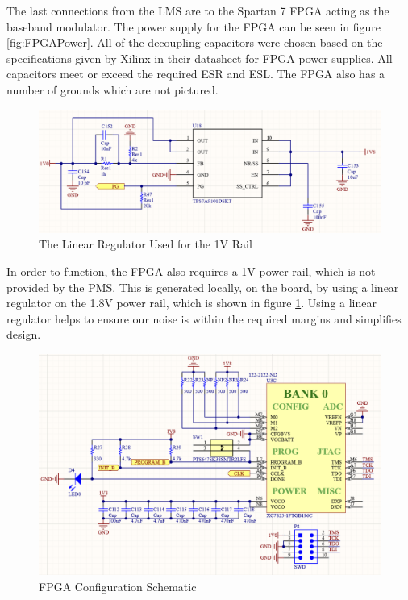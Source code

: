 \documentclass[crop=false]{standalone}
\begin{document}
        The last connections from the LMS are to the Spartan 7 FPGA acting as the baseband modulator. The power supply for the FPGA can be seen in figure \ref{fig:FPGAPower}. All of the decoupling capacitors were chosen based on the specifications given by Xilinx in their datasheet for FPGA power supplies. All capacitors meet or exceed the required ESR and ESL. The FPGA also has a number of grounds which are not pictured.
            
        \begin{figure}[H]
            \centering
            \includegraphics[width=\textwidth]{FPGA1V.PNG}
            \caption{The Linear Regulator Used for the 1V Rail}
            \label{fig:FPGA1V}
        \end{figure}
            
        In order to function, the FPGA also requires a 1V power rail, which is not provided by the PMS. This is generated locally, on the board, by using a linear regulator on the 1.8V power rail, which is shown in figure \ref{fig:FPGA1V}. Using a linear regulator helps to ensure our noise is within the required margins and simplifies design.
            
        \begin{figure}[H]
            \centering
            \includegraphics[width=\textwidth]{FPGAConfig.PNG}
            \caption{FPGA Configuration Schematic}
            \label{fig:FPGAConfig}
        \end{figure}
            
\end{document}

